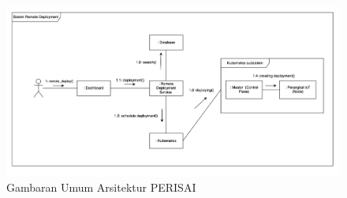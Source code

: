\begin{figure}[ht]
  \centering
  \includegraphics[width=1\textwidth]{resources/chapter-3/gambaran-umum-arsitektur-updated.jpg}
  \caption{Gambaran Umum Arsitektur PERISAI}
  \label{fig:gambaran-umum-arsitektur}
\end{figure}

\pagebreak






